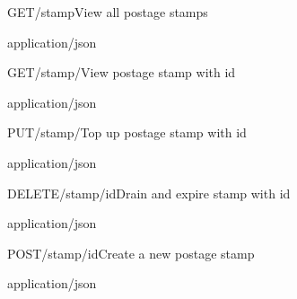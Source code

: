 
\begin{apiRoute}{GET}{/stamp}{View all postage stamps}
{
}
{ }

\begin{routeResponse}{application/json}
\end{routeResponse}
\end{apiRoute}




\begin{apiRoute}{GET}{/stamp/}{View postage stamp with id}
{
}
{ }

\begin{routeParameter} 
\end{routeParameter}
\begin{routeResponse}{application/json}
\end{routeResponse}
\end{apiRoute}




\begin{apiRoute}{PUT}{/stamp/}{Top up postage stamp with id}
{
}
{ }

\begin{routeParameter} 
\end{routeParameter}
\begin{routeResponse}{application/json}
\end{routeResponse}
\end{apiRoute}



\begin{apiRoute}{DELETE}{/stamp/{id}}{Drain and expire stamp with id}
{
}
{ }

\begin{routeParameter} 
\end{routeParameter}
\begin{routeResponse}{application/json}
\end{routeResponse}
\end{apiRoute}


\begin{apiRoute}{POST}{/stamp/{id}}{Create a new postage stamp}
{
}
{ }

\begin{routeParameter} 
\end{routeParameter}
\begin{routeResponse}{application/json}
\end{routeResponse}
\end{apiRoute}
